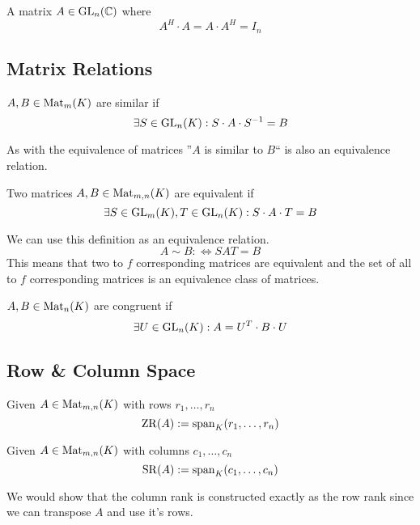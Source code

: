 \begin{definition}
   A matrix \(A \in \operatorname{GL}_n(\mathbb{C})\) where
   \[A^H \cdot A = A \cdot A^H = I_n\]
\end{definition}

\subsection{Matrix Relations}
\begin{definition}\label{def:sim_mat}
   \(A, B \in \operatorname{Mat}_m(K)\) are similar if
   \[\exists S \in \operatorname{GL}_n(K): S \cdot A \cdot S^{-1} = B\]
\end{definition}
\begin{remark}
   As with the equivalence of matrices ''\(A\) is similar to \(B\)`` is also an equivalence relation.
\end{remark}

\begin{definition}\label{def:equiv_mat}
   Two matrices \(A, B \in \operatorname{Mat}_{m,n}(K)\) are equivalent if
   \[\exists S \in \operatorname{GL}_m(K), T \in \operatorname{GL}_n(K): S \cdot A \cdot T = B\]
\end{definition}
\begin{remark}
   We can use this definition as an equivalence relation.
   \[A \sim B :\iff SAT = B\]
   This means that two to \(f\) corresponding matrices are equivalent and the set of all to \(f\) corresponding matrices is an equivalence class of matrices.
\end{remark}

\begin{definition}\label{def:congr_mat}
   \(A, B \in \operatorname{Mat}_n(K)\) are congruent if
   \[\exists U \in \operatorname{GL}_n(K): A = U^T\cdot B\cdot U\]
\end{definition}

\subsection{Row \& Column Space}
\begin{definition}
   Given \(A \in \operatorname{Mat}_{m,n}(K)\) with rows \(r_1, \ldots, r_n\)
   \[\operatorname{ZR}(A) := \operatorname{span}_K(r_1, \ldots, r_n)\]
\end{definition}

\begin{definition}\label{def:col_space}
   Given \(A \in \operatorname{Mat}_{m,n}(K)\) with columns \(c_1, \ldots, c_n\)
   \[\operatorname{SR}(A) := \operatorname{span}_K(c_1, \ldots, c_n)\]
\end{definition}
\begin{remark}
   We would show that the column rank is constructed exactly as the row rank since we can transpose \(A\) and use it's rows.
\end{remark}

